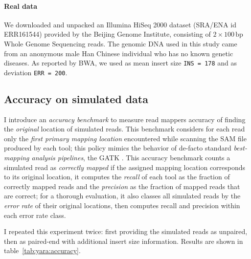 \paragraph{Real data}
We downloaded and unpacked an Illumina HiSeq 2000 dataset (SRA/ENA id ERR161544) provided by the Beijing Genome Institute, consisting of $2 \times 100\,\text{bp}$ Whole Genome Sequencing reads.
The genomic DNA used in this study came from an anonymous male Han Chinese individual who has no known genetic diseases.
As reported by BWA, we used as mean insert size \texttt{INS = 178} and as deviation \texttt{ERR = 200}.

\subsection{Accuracy on simulated data}

I introduce an \emph{accuracy benchmark} to measure read mappers accuracy of finding the \emph{original} location of simulated reads.
This benchmark considers for each read only the \emph{first primary mapping location} encountered while scanning the SAM file \citep{?} produced by each tool;
this policy mimics the behavior of de-facto standard \emph{best-mapping analysis pipelines}, \eg the GATK \citep{DePristo2011}.
This accuracy benchmark counts a simulated read as \emph{correctly mapped} if the assigned mapping location corresponds to its original location,
it computes the \emph{recall} of each tool as the fraction of correctly mapped reads and the \emph{precision} as the fraction of mapped reads that are correct;
for a thorough evaluation, it also classes all simulated reads by the \emph{error rate} of their original locations, then computes recall and precision within each error rate class.

I repeated this experiment twice: first providing the simulated reads as unpaired, then as paired-end with additional insert size information.
Results are shown in table~\ref{tab:yara:accuracy}.



